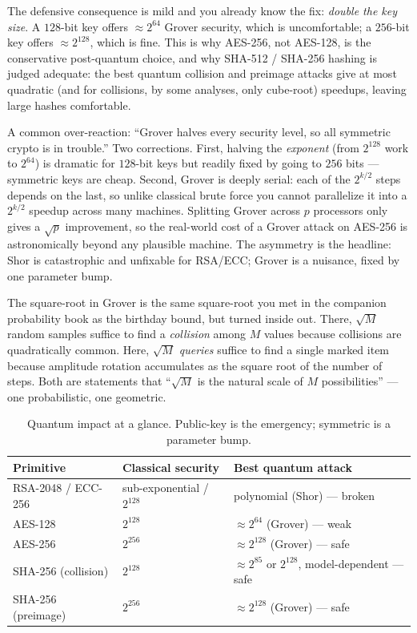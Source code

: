 The defensive consequence is mild and you already know the fix: \emph{double the key size}. A $128$-bit key offers $\approx 2^{64}$ Grover security, which is uncomfortable; a $256$-bit key offers $\approx 2^{128}$, which is fine. This is why AES-256, not AES-128, is the conservative post-quantum choice, and why SHA-512 / SHA-256 hashing is judged adequate: the best quantum collision and preimage attacks give at most quadratic (and for collisions, by some analyses, only cube-root) speedups, leaving large hashes comfortable.

\begin{trapbox}
A common over-reaction: ``Grover halves every security level, so all symmetric crypto is in trouble.'' Two corrections. First, halving the \emph{exponent} (from $2^{128}$ work to $2^{64}$) is dramatic for $128$-bit keys but readily fixed by going to $256$ bits --- symmetric keys are cheap. Second, Grover is deeply serial: each of the $2^{k/2}$ steps depends on the last, so unlike classical brute force you cannot parallelize it into a $2^{k/2}$ speedup across many machines. Splitting Grover across $p$ processors only gives a $\sqrt p$ improvement, so the real-world cost of a Grover attack on AES-256 is astronomically beyond any plausible machine. The asymmetry is the headline: Shor is catastrophic and unfixable for RSA/ECC; Grover is a nuisance, fixed by one parameter bump.
\end{trapbox}

\begin{connectionbox}
The square-root in Grover is the same square-root you met in the companion probability book as the birthday bound, but turned inside out. There, $\sqrt M$ random samples suffice to find a \emph{collision} among $M$ values because collisions are quadratically common. Here, $\sqrt M$ \emph{queries} suffice to find a single marked item because amplitude rotation accumulates as the square root of the number of steps. Both are statements that ``$\sqrt M$ is the natural scale of $M$ possibilities'' --- one probabilistic, one geometric.
\end{connectionbox}

\begin{table}[H]
\centering
\begin{tabular}{@{}lll@{}}
\toprule
Primitive & Classical security & Best quantum attack \\
\midrule
RSA-2048 / ECC-256 & sub-exponential / $2^{128}$ & polynomial (Shor) --- broken \\
AES-128 & $2^{128}$ & $\approx 2^{64}$ (Grover) --- weak \\
AES-256 & $2^{256}$ & $\approx 2^{128}$ (Grover) --- safe \\
SHA-256 (collision) & $2^{128}$ & $\approx 2^{85}$ or $2^{128}$, model-dependent --- safe \\
SHA-256 (preimage) & $2^{256}$ & $\approx 2^{128}$ (Grover) --- safe \\
\bottomrule
\end{tabular}
\caption{Quantum impact at a glance. Public-key is the emergency; symmetric is a parameter bump.}
\label{ch35:tab-impact}
\end{table}

